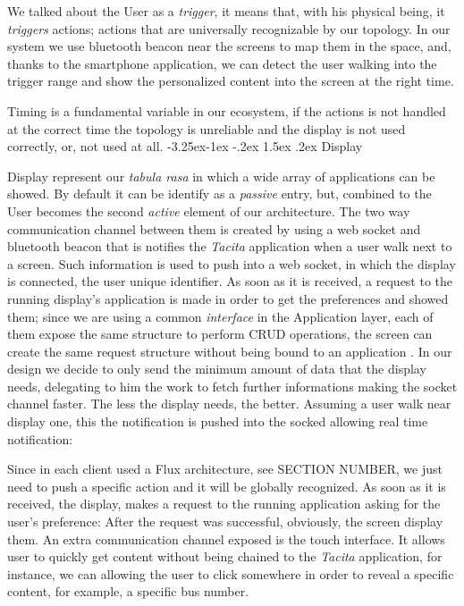\documentclass[]{usiinfbachelorproject}
\makeatletter
\newcommand\subsubsection{\@startsection{subsubsection}{3}{\z@}%
                {-3.25ex\@plus -1ex \@minus -.2ex}%
                {1.5ex \@plus .2ex}%
                {\normalfont\normalsize\bfseries}}
\makeatother
\begin{document}
We talked about the User as a \emph{trigger}, it means that, with his physical being, it \emph{triggers} actions; actions that are universally recognizable by our topology. In our system we use bluetooth beacon near the screens to map them in the space, and, thanks to the smartphone application, we can detect the user walking into the trigger range and show the personalized content into the screen at the right time. 

Timing is a fundamental variable in our ecosystem, if the actions is not handled at the correct time the topology is unreliable and the display is not used correctly, or, not used at all. 
\subsubsection{Display}

Display represent our \emph{tabula rasa} in which a wide array of applications can be showed. By default it can be identify as a \emph{passive} entry, but, combined to the User becomes the second \emph{active} element of our architecture. The two way communication channel between them is created by using a web socket and bluetooth beacon that is notifies the \emph{Tacita} application when a user walk next to a screen. Such information is used to push into a web socket, in which the display is connected, the user unique identifier. As soon as it is received, a request to the running display's application is made in order to get the preferences and showed them; since we are using a common \emph{interface} in the Application layer, each of them expose the same structure to perform CRUD operations, the screen can create the same request structure without being bound to an application .
In our design we decide to only send the minimum amount of data that the display needs, delegating to him the work to fetch further informations making the socket channel faster. The less the display needs, the better. Assuming a user walk near display one, this the notification is pushed into the socked allowing real time notification:

Since in each client used a Flux architecture, see SECTION NUMBER, we just need to push a specific action and it will be globally recognized. As soon as it is received, the display, makes a request to the running application asking for the user's preference:
After the request was successful, obviously, the screen display them.
 An extra communication channel exposed is the touch interface. It allows user to quickly get content without being chained to the \emph{Tacita} application, for instance, we can allowing the user to click somewhere in order to reveal a specific content, for example, a specific bus number.
  
\end{document}
